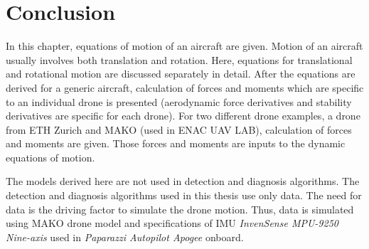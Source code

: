 

\section{Conclusion}
In this chapter, equations of motion of an aircraft are given. 
Motion of an aircraft usually involves both translation and rotation. 
Here, equations for translational and rotational motion are discussed separately in detail.
After the equations are derived for a generic aircraft, calculation of forces and moments which are specific to an individual drone is presented (aerodynamic force derivatives and stability derivatives are specific for each drone). For two different drone examples, a drone from ETH Zurich and MAKO (used in ENAC UAV LAB), calculation of forces and moments are given.
Those forces and moments are inputs to the dynamic equations of motion. 

The models derived here are not used in detection and diagnosis algorithms. 
The detection and diagnosis algorithms used in this thesis use only data. 
The need for data is the driving factor to simulate the drone motion. 
Thus, data is simulated using MAKO drone model and specifications of IMU \emph{InvenSense MPU-9250 Nine-axis} used in \emph{Paparazzi Autopilot Apogee} onboard. 
 

